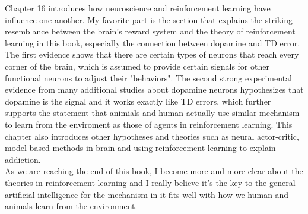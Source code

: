 \documentclass[12pt,a4paper]{article}
\begin{document}
Chapter 16 introduces how neuroscience and reinforcement learning have influence one another. My favorite part is the section that explains the striking resemblance between the brain's reward system and the theory of reinforcement learning in this book, especially the connection between dopamine and TD error. The first evidence shows that there are certain types of neurons that reach every corner of the brain, which is assumed to provide certain signals for other functional neurons to adjust their "behaviors". The second strong experimental evidence from many additional studies about dopamine neurons hypothesizes that dopamine is the signal and it works exactly like TD errors, which further supports the statement that animials and human actually use similar mechanism to learn from the enviroment as those of agents in reinforcement learning. This chapter also introduces other hypotheses and theories such as neural actor-critic, model based methods in brain and using reinforcement learning to explain addiction. \\

As we are reaching the end of this book, I become more and more clear about the theories in reinforcement learning and I really believe it's the key to the general artificial intelligence for the mechanism in it fits well with how we human and animals learn from the environment.
\end{document}
